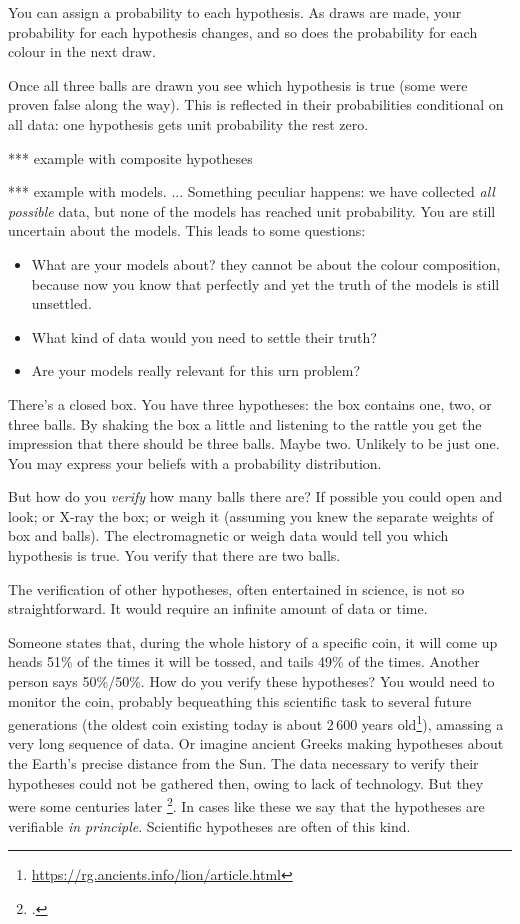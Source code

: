 \documentclass[\ifafour a4paper,12pt,\else a5paper,10pt,\fi%
onecolumn,oneside,article,%
british%
]{memoir}
\theoremstyle{remark}
\theoremstyle{innote}
\newcommand*{\citep}{\footcites}
\renewcommand*{\|}[1][]{\nonscript\:#1\vert\nonscript\:\mathopen{}}
\renewcommand*{\=}{\TextOrMath\texteq\eq}
\begin{document}
You can assign a probability to each hypothesis. As draws are made, your
probability for each hypothesis changes, and so does the probability for
each colour in the next draw.

Once all three balls are drawn you see which hypothesis is true (some were
proven false along the way). This is reflected in their probabilities
conditional on all data: one hypothesis gets unit probability the rest
zero.

*** example with composite hypotheses

*** example with models. ... Something peculiar happens: we have collected
\emph{all possible} data, but none of the models has reached unit
probability. You are still uncertain about the models. This leads to some
questions:
\begin{itemize}
\item What are your models about? they cannot be about the colour
  composition, because now you know that perfectly and yet the truth of the
  models is still unsettled.
\item What kind of data would you need to settle their truth?
\item Are your models really relevant for this urn problem?
\end{itemize}










There's a closed box. You have three hypotheses: the box contains one, two,
or three balls. By shaking the box a little and listening to the rattle you
get the impression that there should be three balls. Maybe two. Unlikely to
be just one. You may express your beliefs with a probability distribution.

But how do you \emph{verify} how many balls there are? If possible you
could open and look; or X-ray the box; or weigh it (assuming you knew the
separate weights of box and balls). The electromagnetic or weigh data would
tell you which hypothesis is true. You verify that there are two balls.

The verification of other hypotheses, often entertained in science, is not
so straightforward. It would require an infinite amount of data or time.

Someone states that, during the whole history of a specific coin, it will
come up heads 51\% of the times it will be tossed, and tails 49\% of the
times. Another person says 50\%/50\%. How do you verify these hypotheses?
You would need to monitor the coin, probably bequeathing this scientific
task to several future generations (the oldest coin existing today is about
2\,600 years
old\footnote{\url{https://rg.ancients.info/lion/article.html}}), amassing a
very long sequence of data. Or imagine ancient Greeks making hypotheses
about the Earth's precise distance from the Sun. The data necessary to
verify their hypotheses could not be gathered then, owing to lack of
technology. But they were some centuries later \citep{goldstein1985}. In
cases like these we say that the hypotheses are verifiable \emph{in
  principle}. Scientific hypotheses are often of this kind.
\end{document}
